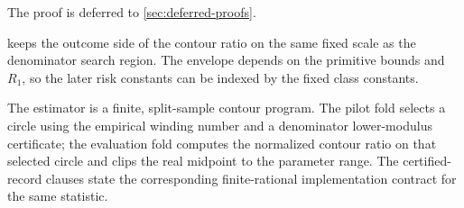 \documentclass[11pt]{article}
\begin{document}
The proof is deferred to \cref{sec:deferred-proofs}.

 keeps the outcome side of the contour ratio on the same fixed scale as the denominator search region. The envelope depends on the primitive bounds and \(R_1\), so the later risk constants can be indexed by the fixed class constants.

The estimator is a finite, split-sample contour program. The pilot fold selects a circle using the empirical winding number and a denominator lower-modulus certificate; the evaluation fold computes the normalized contour ratio on that selected circle and clips the real midpoint to the parameter range. The certified-record clauses state the corresponding finite-rational implementation contract for the same statistic.
\end{document}
